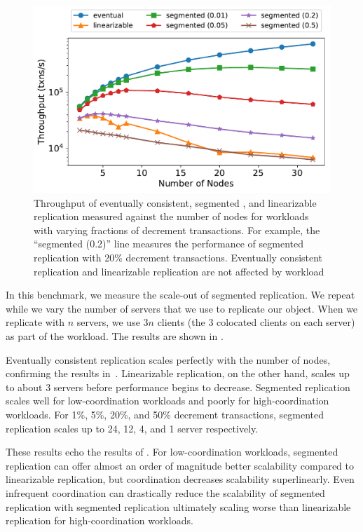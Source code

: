 \begin{figure}[t]
  \centering
  \includegraphics[width=\columnwidth]{figures/throughput_vs_num_nodes_multi.pdf}
  \caption{%
    Throughput of eventually consistent, segmented \invariantconfluent{}, and
    linearizable replication measured against the number of nodes for workloads
    with varying fractions of decrement transactions. For example, the
    ``segmented (0.2)'' line measures the performance of segmented
    \invariantconfluent{} replication with 20\% decrement transactions.
    Eventually consistent replication and linearizable replication are not
    affected by workload
  }
\end{figure}

\begin{benchmark}
  In this benchmark, we measure the scale-out of segmented
  \invariantconfluent{} replication. We repeat  while
  we vary the number of servers that we use to replicate our object. When we
  replicate with $n$ servers, we use $3n$ clients (the $3$ colocated clients on
  each server) as part of the workload. The results are shown in
  .

  Eventually consistent replication scales perfectly with the number of nodes,
  confirming the results in~\cite{bailis2014coordination}. Linearizable
  replication, on the other hand, scales up to about 3 servers before
  performance begins to decrease. Segmented \invariantconfluent{} replication
  scales well for low-coordination workloads and poorly for high-coordination
  workloads. For 1\%, 5\%, 20\%, and 50\% decrement transactions, segmented
  \invariantconfluent{} replication scales up to 24, 12, 4, and 1 server
  respectively.

  These results echo the results of . For
  low-coordination workloads, segmented \invariantconfluent{} replication can
  offer almost an order of magnitude better scalability compared to
  linearizable replication, but coordination decreases scalability
  superlinearly. Even infrequent coordination can drastically reduce the
  scalability of segmented \invariantconfluent{} replication with segmented
  \invariantconfluent{} replication ultimately scaling worse than linearizable
  replication for high-coordination workloads.
\end{benchmark}
